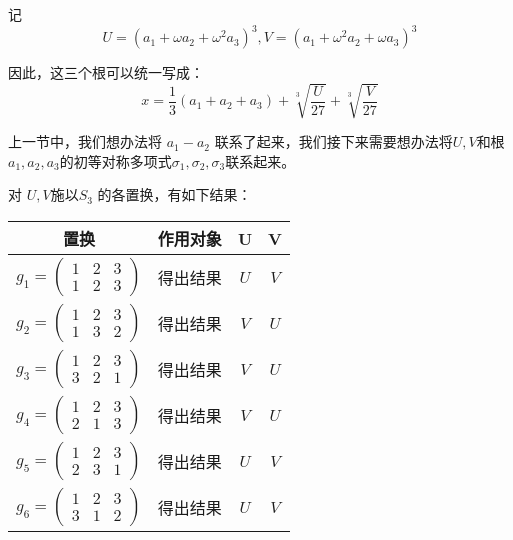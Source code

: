\documentclass[12pt]{article}
\begin{document}
记
$$
U = (a_1 + \omega a_2 + \omega^2 a_3)^3, V = (a_1 + \omega^2 a_2 + \omega a_3)^3
$$

因此，这三个根可以统一写成：
$$
x = \frac{1}{3}(a_1+a_2+a_3) + \sqrt[3]{\frac{U}{27}} + \sqrt[3]{\frac{V}{27}}
$$

上一节中，我们想办法将 $a_1-a_2$ 联系了起来，我们接下来需要想办法将$U,V$和根$a_1,a_2,a_3$的初等对称多项式$\sigma_1, \sigma_2, \sigma_3$联系起来。

对 $U,V$施以$S_3$ 的各置换，有如下结果：
\begin{table}[H]
	\centering  %
	\begin{tabular}{|c|c|c|c|}  
	    \hline
	    置换 & 作用对象 & U & V \\
	    \hline
	    $g_1 = \begin{pmatrix}
	    1 & 2 & 3\\1 & 2 & 3
	    \end{pmatrix}$ & 得出结果 & $U$ & $V$ \\
		\hline
		$g_2 = \begin{pmatrix}
	    1 & 2 & 3\\1 & 3 & 2
	    \end{pmatrix}$ & 得出结果 & $V$ & $U$ \\
	    \hline
	    $g_3 = \begin{pmatrix}
	    1 & 2 & 3\\3 & 2 & 1
	    \end{pmatrix}$ & 得出结果 & $V$ & $U$ \\
	    \hline
	    $g_4 = \begin{pmatrix}
	    1 & 2 & 3\\2 & 1 & 3
	    \end{pmatrix}$ & 得出结果 & $V$ & $U$ \\
	    \hline
	    $g_5 = \begin{pmatrix}
	    1 & 2 & 3\\2 & 3 & 1
	    \end{pmatrix}$ & 得出结果 & $U$ & $V$ \\
	    \hline
	    $g_6 = \begin{pmatrix}
	    1 & 2 & 3\\3 & 1 & 2
	    \end{pmatrix}$ & 得出结果 & $U$ & $V$ \\
	    \hline
	\end{tabular}
\end{table}
\end{document}
